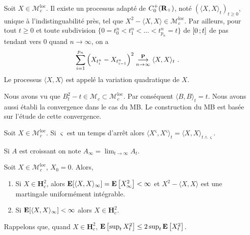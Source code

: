 	\begin{thm}[Meyer]
		Soit $X \in \mathcal{M}^{\text{loc}}_c$.
		Il existe un processus adapté de $C_0^+(\mathbf{R}_+)$, noté $(\langle X,X \rangle_t )_{t \geq 0}$, unique à l'indistinguabilité près, tel que $X^2 - \langle X,X \rangle \in \mathcal{M}^{\text{loc}}_c$.
		Par ailleurs, pour tout $t \geq 0$ et toute subdivision $\{ 0 = t_0^n < t_1^n < \ldots < t_{p_n}^n = t \}$ de $\mathopen{}\mathclose{\left[0\mathclose{}\mathpunct{};t\right]}$ de pas tendant vers $0$ quand $n \longrightarrow \infty$, on a
		$$\sum_{i = 1}^{p_n} \left( X_{t_i^n} - X_{t_{i - 1}^n} \right)^2 \overset{\mathbf{P}}{\underset{n \to \infty}{\longrightarrow}} \langle X,X \rangle_t\ .$$
		Le processus $\langle X,X \rangle$ est appelé la variation quadratique de $X$.
	\end{thm}
	
	\begin{rem}
		Nous avons vu que $B_t^2 - t \in \mathcal{M}_c \subset \mathcal{M}^{\text{loc}}_c$.
		Par conséquent $\langle B,B \rangle_t = t$.
		Nous avons aussi établi la convergence dans le cas du MB.
		Le construction du MB est basée sur l'étude de cette convergence.
	\end{rem}
	
	\begin{pop}
		Soit $X \in \mathcal{M}^{\text{loc}}_c$.
		Si $\varsigma$ est un temps d'arrêt alors $\langle X^{\varsigma},X^{\varsigma} \rangle_t = \langle X,X \rangle_{t \wedge \varsigma}$.
	\end{pop}
	
	\begin{note}
		Si $A$ est croissant on note $A_\infty = \lim_{t \to \infty} A_t$.
	\end{note}
	
	\begin{thm}
		Soit $X \in \mathcal{M}^{\text{loc}}_c$, $X_0 = 0$.
		Alors,
		\begin{enumerate}[1)]
			\item Si $X \in \mathbf{H}_c^2$, alors $\mathbf{E} [\langle X,X \rangle_\infty ] = \mathbf{E} \left[ X_\infty^2 \right] < \infty$ et $X^2 - \langle X,X \rangle$ est une martingale uniformément intégrable.
			\item Si $\mathbf{E} [\langle X,X \rangle_\infty ] < \infty$ alors $X \in \mathbf{H}_c^2$.
		\end{enumerate}
	\end{thm}
	
	Rappelons que, quand $X \in \mathbf{H}_c^2$, $\mathbf{E} \left[ \sup_t X_t^2 \right] \leq 2 \sup_t \mathbf{E} \left[ X_t^2 \right]$.\\
	
